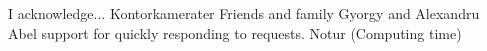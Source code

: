 \begin{acknowledgements}
I acknowledge...
Kontorkamerater
Friends and family
Gyorgy and Alexandru
Abel support for quickly responding to requests. Notur (Computing time)
\end{acknowledgements}